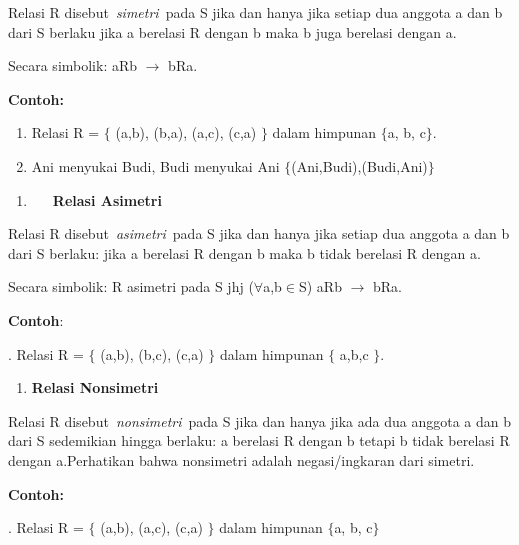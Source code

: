 \documentclass[11pt,fleqn]{book} %
\begin{document}
\noindent 

\noindent Relasi R disebut~\textit{simetri}~pada S jika dan hanya jika setiap dua anggota a dan b dari S berlaku jika a berelasi R dengan b maka b juga berelasi dengan a. 

\noindent Secara simbolik: aRb $\mathrm{\to}$ bRa.

\noindent 

\noindent \textbf{Contoh:}

\begin{enumerate}
\item \textbf{ }Relasi R = $\{$ (a,b), (b,a), (a,c), (c,a) $\}$ dalam himpunan $\{$a, b, c$\}$.

\item  Ani menyukai Budi, Budi menyukai Ani $\{$(Ani,Budi),(Budi,Ani)$\}$
\end{enumerate}

\noindent 

\begin{enumerate}
\item  ~~~\textbf{Relasi Asimetri}
\end{enumerate}

\noindent \textbf{}

\noindent Relasi R disebut~\textit{asimetri}~pada S jika dan hanya jika setiap dua anggota a dan b dari S berlaku: jika a berelasi R dengan b maka b tidak berelasi R dengan a.

\noindent Secara simbolik: R asimetri pada S jhj ($\mathrm{\forall }$a,b$\mathrm{\in }$S) aRb $\mathrm{\to}$ bRa.

\noindent 

\noindent \textbf{Contoh}:

\noindent 

. Relasi R = $\{$ (a,b), (b,c), (c,a) $\}$ dalam himpunan $\{$ a,b,c $\}$.

\noindent \textbf{}

\begin{enumerate}
\item \textbf{ Relasi Nonsimetri}
\end{enumerate}

\noindent Relasi R disebut~\textit{nonsimetri}~pada S jika dan hanya jika ada dua anggota a dan b dari S sedemikian hingga berlaku: a berelasi R dengan b tetapi b tidak berelasi R dengan a.Perhatikan bahwa nonsimetri adalah negasi/ingkaran dari simetri.

\noindent \textbf{Contoh:}

. Relasi R = $\{$ (a,b), (a,c), (c,a) $\}$ dalam himpunan $\{$a, b, c$\}$
\end{document}
